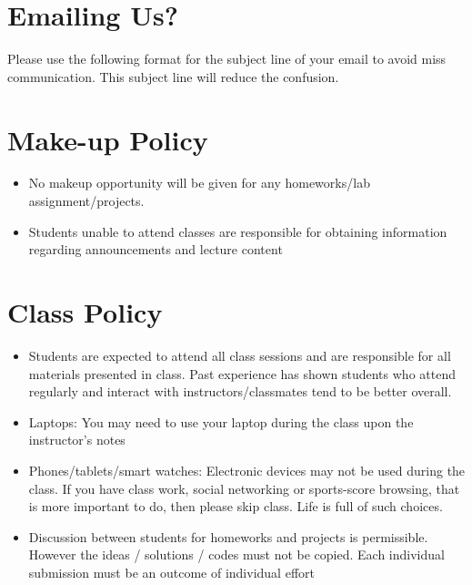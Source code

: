 \documentclass[letterpaper]{inzane_syllabus} %
\begin{document}
\vspace{0.1 cm}
\section{Emailing Us?}
\vspace{0.05 cm}

Please use the following format for the subject line of your email to avoid miss communication. This subject line will reduce the confusion.
\begin{center}
\textbf{}
\end{center}

\vspace{0.1cm}
\section{Make-up Policy}
\vspace{0.05cm}
\begin{itemize} [label= \color{myCOLOR}{$\circ$}]
    \item No makeup opportunity will be given for any homeworks/lab assignment/projects. 
    \item Students unable to attend classes are responsible for obtaining information regarding announcements and lecture content
\end{itemize}

\vspace{0.1cm}
\section{Class Policy}
\vspace{0.05cm}

\begin{itemize} [label= \color{myCOLOR}{$\circ$}]
    \item Students are expected to attend all class sessions and are responsible for all materials presented in class. Past experience has shown students who attend regularly and interact with instructors/classmates tend to be better overall.
    \item Laptops: You may need to use your laptop during the class upon the instructor's notes
    \item Phones/tablets/smart watches: Electronic devices may not be used during the class. If you have class work, social networking or sports-score browsing, that is more important to do, then please skip class. Life is full of such choices.
    \item Discussion between students for homeworks and projects is permissible. However the ideas / solutions / codes must not be copied. Each individual submission must be an outcome of individual effort
\end{itemize}
\end{document}
